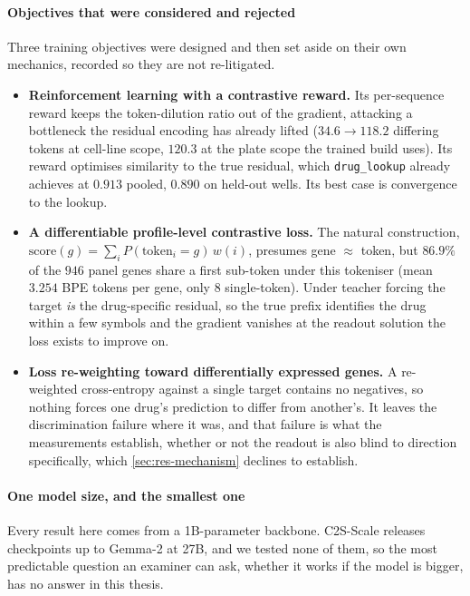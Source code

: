 \paragraph{Objectives that were considered and rejected} Three training
objectives were designed and then set aside on their own mechanics, recorded so
they are not re-litigated.
\begin{itemize}
  \item \textbf{Reinforcement learning with a contrastive reward.} Its
        per-sequence reward keeps the token-dilution ratio out of the gradient,
        attacking a bottleneck the residual encoding has already lifted ($34.6
        \rightarrow 118.2$ differing tokens at cell-line scope, $120.3$ at the
        plate scope the trained build uses). Its reward optimises similarity to
        the true residual, which \texttt{drug\_lookup} already achieves at
        $0.913$ pooled, $0.890$ on held-out wells. Its best case is convergence
        to the lookup.
  \item \textbf{A differentiable profile-level contrastive loss.} The natural
        construction, $\textrm{score}(g) = \sum_i P(\textrm{token}_i =
        g)\,w(i)$, presumes gene $\approx$ token, but $86.9\%$ of the $\num{946}$
        panel genes share a first sub-token under this tokeniser (mean $3.254$
        BPE tokens per gene, only $8$ single-token). Under teacher forcing the
        target \emph{is} the drug-specific residual, so the true prefix
        identifies the drug within a few symbols and the gradient vanishes at
        the readout solution the loss exists to improve on.
  \item \textbf{Loss re-weighting toward differentially expressed genes.}
        A re-weighted cross-entropy against a single target contains no
        negatives, so nothing forces one drug's prediction to differ from
        another's. It leaves the discrimination failure where it was, and that
        failure is
        what the measurements establish, whether or not the readout is also
        blind to direction specifically, which \cref{sec:res-mechanism} declines
        to establish.
\end{itemize}

\paragraph{One model size, and the smallest one} Every result here comes from a
1B-parameter backbone. C2S-Scale releases checkpoints up to Gemma-2 at 27B, and
we tested none of them, so the most predictable question an examiner can ask,
whether it works if the model is bigger, has no answer in this thesis.

